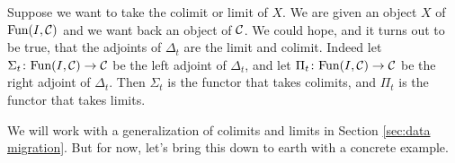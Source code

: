\documentclass[CT4S-EN-RU]{subfiles}
\begin{document}
\begin{blockRUS}
\end{blockRUS}

\begin{blockENG}
Suppose we want to take the colimit or limit of $X$. We are given an object $X$ of $\textnormal{Fun}(I,\mathcal{C})$ and we want back an object of $\mathcal{C}$. We could hope, and it turns out to be true, that the adjoints of $\Delta_t$ are the limit and colimit. Indeed let $\Sigma_t\colon\textnormal{Fun}(I,\mathcal{C})\rightarrow\mathcal{C}$ be the left adjoint of $\Delta_t$, and let $\Pi_t\colon\textnormal{Fun}(I,\mathcal{C})\rightarrow\mathcal{C}$ be the right adjoint of $\Delta_t$. Then $\Sigma_t$ is the functor that takes colimits, and $\Pi_t$ is the functor that takes limits.
\end{blockENG}

\begin{blockRUS}
\end{blockRUS}

\begin{blockENG}
We will work with a generalization of colimits and limits in Section \ref{sec:data migration}. But for now, let's bring this down to earth with a concrete example.
\end{blockENG}

\begin{blockRUS}
\end{blockRUS}
\end{document}
